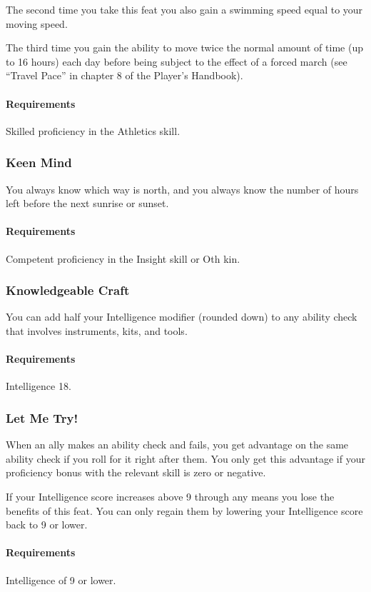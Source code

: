     The second time you take this feat you also gain a swimming speed equal to your moving speed.

    The third time you gain the ability to move twice the normal amount of time (up to 16 hours) each day before being subject to the effect of a forced march (see ``Travel Pace'' in chapter 8 of the Player's Handbook).
    \paragraph{Requirements} Skilled proficiency in the Athletics skill.
\subsubsection{Keen Mind} \label{feat::keenmind}
    You always know which way is north, and you always know the number of hours left before the next sunrise or sunset.
    \paragraph{Requirements} Competent proficiency in the Insight skill or Oth kin.
\subsubsection{Knowledgeable Craft} \label{feat::knowledgeablecraft}
    You can add half your Intelligence modifier (rounded down) to any ability check that involves instruments, kits, and tools.
    \paragraph{Requirements} Intelligence 18.
\subsubsection{Let Me Try!} \label{feat::letmetry}
    When an ally makes an ability check and fails, you get advantage on the same ability check if you roll for it right after them.
    You only get this advantage if your proficiency bonus with the relevant skill is zero or negative.

    If your Intelligence score increases above 9 through any means you lose the benefits of this feat.
    You can only regain them by lowering your Intelligence score back to 9 or lower.
    \paragraph{Requirements} Intelligence of 9 or lower.

